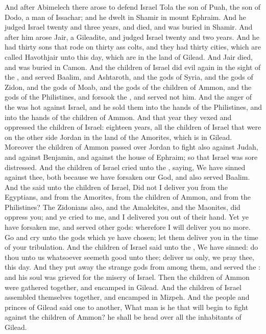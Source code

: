 \begin{biblechapter} %
 And after Abimelech there arose to defend Israel Tola the son of Puah, the son of Dodo, a man of Issachar; and he dwelt in Shamir in mount Ephraim.
\verse And he judged Israel twenty and three years, and died, and was buried in Shamir.
 And after him arose Jair, a Gileadite, and judged Israel twenty and two years.
\verse And he had thirty sons that rode on thirty ass colts, and they had thirty cities, which are called Havothjair unto this day, which are in the land of Gilead.
\verse And Jair died, and was buried in Camon.
 And the children of Israel did evil again in the sight of the \LORD, and served Baalim, and Ashtaroth, and the gods of Syria, and the gods of Zidon, and the gods of Moab, and the gods of the children of Ammon, and the gods of the Philistines, and forsook the \LORD, and served not him.
\verse And the anger of the \LORD was hot against Israel, and he sold them into the hands of the Philistines, and into the hands of the children of Ammon.
\verse And that year they vexed and oppressed the children of Israel: eighteen years, all the children of Israel that were on the other side Jordan in the land of the Amorites, which is in Gilead.
\verse Moreover the children of Ammon passed over Jordan to fight also against Judah, and against Benjamin, and against the house of Ephraim; so that Israel was sore distressed.
\verse And the children of Israel cried unto the \LORD, saying, We have sinned against thee, both because we have forsaken our God, and also served Baalim.
\verse And the \LORD said unto the children of Israel, Did not I deliver you from the Egyptians, and from the Amorites, from the children of Ammon, and from the Philistines?
\verse The Zidonians also, and the Amalekites, and the Maonites, did oppress you; and ye cried to me, and I delivered you out of their hand.
\verse Yet ye have forsaken me, and served other gods: wherefore I will deliver you no more.
\verse Go and cry unto the gods which ye have chosen; let them deliver you in the time of your tribulation.
\verse And the children of Israel said unto the \LORD, We have sinned: do thou unto us whatsoever seemeth good unto thee; deliver us only, we pray thee, this day.
\verse And they put away the strange gods from among them, and served the \LORD: and his soul was grieved for the misery of Israel.
\verse Then the children of Ammon were gathered together, and encamped in Gilead. And the children of Israel assembled themselves together, and encamped in Mizpeh.
\verse And the people and princes of Gilead said one to another, What man is he that will begin to fight against the children of Ammon? he shall be head over all the inhabitants of Gilead.
\end{biblechapter}

